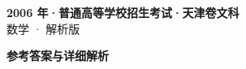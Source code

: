 \documentclass[zihao=-4, a4paper]{ctexart}
\begin{document}
\begin{center}
  {\Large\bfseries 2006 年·普通高等学校招生考试·天津卷文科}\\[4pt]
  {\large 数学 · 解析版}
\end{center}
\medskip
{}

\clearpage
{}
\begin{center}{\Large\bfseries 参考答案与详细解析}\end{center}
\medskip

\end{document}
